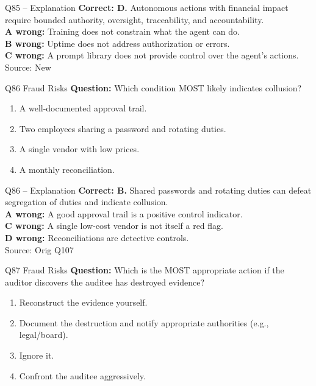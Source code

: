 \documentclass[aspectratio=169,10pt]{beamer}
\begin{document}
\begin{frame}[t]{Q85 -- Explanation}
	\footnotesize
	\textbf{Correct: D.} Autonomous actions with financial impact require bounded authority, oversight, traceability, and accountability. \\[5pt]
\textbf{A wrong:} Training does not constrain what the agent can do. \\[3pt]
\textbf{B wrong:} Uptime does not address authorization or errors. \\[3pt]
\textbf{C wrong:} A prompt library does not provide control over the agent's actions. \\[3pt]
	\vfill {\tiny Source: New}
\end{frame}

\begin{frame}[t]{Q86 \hfill {\scriptsize Fraud Risks}}
	\small
	\textbf{Question:} Which condition MOST likely indicates collusion?
	\begin{enumerate}[label=\Alph*.,itemsep=1pt,topsep=3pt]
			\item A well-documented approval trail.
			\item Two employees sharing a password and rotating duties.
			\item A single vendor with low prices.
			\item A monthly reconciliation.
	\end{enumerate}
\end{frame}

\begin{frame}[t]{Q86 -- Explanation}
	\footnotesize
	\textbf{Correct: B.} Shared passwords and rotating duties can defeat segregation of duties and indicate collusion. \\[5pt]
\textbf{A wrong:} A good approval trail is a positive control indicator. \\[3pt]
\textbf{C wrong:} A single low-cost vendor is not itself a red flag. \\[3pt]
\textbf{D wrong:} Reconciliations are detective controls. \\[3pt]
	\vfill {\tiny Source: Orig Q107}
\end{frame}

\begin{frame}[t]{Q87 \hfill {\scriptsize Fraud Risks}}
	\small
	\textbf{Question:} Which is the MOST appropriate action if the auditor discovers the auditee has destroyed evidence?
	\begin{enumerate}[label=\Alph*.,itemsep=1pt,topsep=3pt]
			\item Reconstruct the evidence yourself.
			\item Document the destruction and notify appropriate authorities (e.g., legal/board).
			\item Ignore it.
			\item Confront the auditee aggressively.
	\end{enumerate}
\end{frame}
\end{document}
